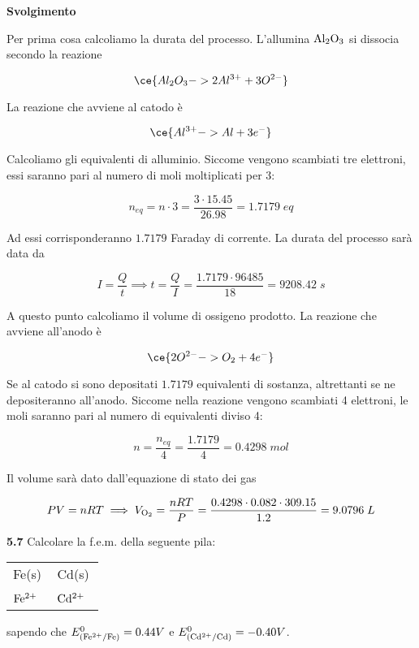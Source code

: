 \vspace{0.2cm}\large\textbf{Svolgimento}\normalsize

\vspace{0.2cm}Per prima cosa calcoliamo la durata del processo. L'allumina $\rm Al_2O_3$ si dissocia secondo la reazione 

$$\ce{Al_2O_3 -> 2Al^{3+} + 3O^{2-}}$$

La reazione che avviene al catodo è

$$\ce{Al^{3+} -> Al + 3e^-}$$

Calcoliamo gli equivalenti di alluminio. Siccome vengono scambiati tre elettroni, essi saranno pari al numero di moli moltiplicati per 3:

$$n_{eq}=n \cdot 3
=\frac{3 \cdot 15.45}{26.98}
=1.7179\;eq$$

Ad essi corrisponderanno $1.7179$ Faraday di corrente. La durata del processo sarà data da

$$I=\frac{Q}{t}
\implies
t=\frac{Q}{I}=\frac{1.7179 \cdot 96485}{18}
=9208.42\;s$$

A questo punto calcoliamo il volume di ossigeno prodotto. La reazione che avviene all'anodo è

$$\ce{2O^{2-} -> O_2 + 4e^-}$$

Se al catodo si sono depositati $1.7179$ equivalenti di sostanza, altrettanti se ne depositeranno all'anodo. Siccome nella reazione vengono scambiati 4 elettroni, le moli saranno pari al numero di equivalenti diviso 4:

$$n=\frac{n_{eq}}{4}
=\frac{1.7179}{4}
=0.4298\;mol$$

Il volume sarà dato dall'equazione di stato dei gas

$$PV=nRT
\implies
V_{\rm O_2}=\frac{nRT}{P}=\frac{0.4298 \cdot 0.082 \cdot 309.15}{1.2}=9.0796 \;L$$

\vspace{0.2cm}\textbf{5.7} Calcolare la f.e.m. della seguente pila:

\begin{center}
    \begin{tabular}{|p{3.7cm}||p{3.7cm}|}
         Fe(s) & Cd(s)\\[0.5ex]
         $\rm Fe^{2+}$ \, \big[0.0120 M\big] & $\rm Cd^{2+}$ \, \big[0.8988 M\big] \\[0.5ex]
    \end{tabular}
\end{center}

sapendo che $E^0_{(\rm Fe^{2+}/Fe)}=0.44V$ e $E^0_{(\rm Cd^{2+}/Cd)}=-0.40V$.

